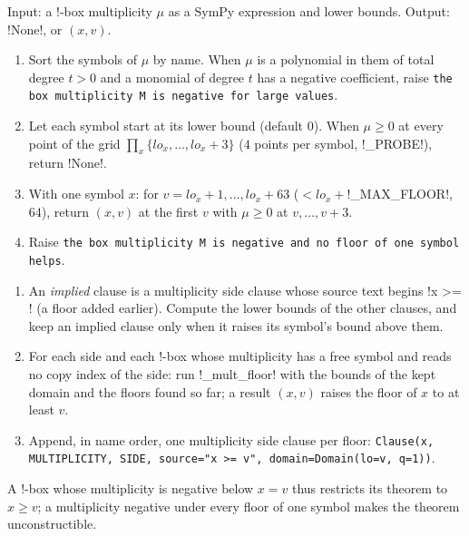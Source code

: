 \begin{algorithm}\label{alg:kernel-mult-floor}
Input: a !-box multiplicity $\mu$ as a SymPy expression and lower bounds. Output: \py!None!, or $(x, v)$.
\begin{enumerate}
\item Sort the symbols of $\mu$ by name. When $\mu$ is a polynomial in them of total degree $t>0$ and a monomial of degree $t$ has a negative coefficient, raise \texttt{the box multiplicity M is negative for large values}.
\item Let each symbol start at its lower bound (default $0$). When $\mu\ge0$ at every point of the grid $\prod_x\{\mathit{lo}_x,\ldots,\mathit{lo}_x+3\}$ ($4$ points per symbol, \py!_PROBE!), return \py!None!.
\item With one symbol $x$: for $v=\mathit{lo}_x+1,\ldots,\mathit{lo}_x+63$ ($<\mathit{lo}_x+$\py!_MAX_FLOOR!, $64$), return $(x,v)$ at the first $v$ with $\mu\ge0$ at $v,\ldots,v+3$.
\item Raise \texttt{the box multiplicity M is negative and no floor of one symbol helps}.
\end{enumerate}
\end{algorithm}

\begin{algorithm}\label{alg:kernel-box-floors}
\begin{enumerate}
\item An \emph{implied} clause is a multiplicity side clause whose source text begins \code!x >= ! (a floor added earlier). Compute the lower bounds of the other clauses, and keep an implied clause only when it raises its symbol's bound above them.
\item For each side and each !-box whose multiplicity has a free symbol and reads no copy index of the side: run \py!_mult_floor! with the bounds of the kept domain and the floors found so far; a result $(x, v)$ raises the floor of $x$ to at least $v$.
\item Append, in name order, one multiplicity side clause per floor: \texttt{Clause(\allowbreak{}x,\allowbreak{} MULTIPLICITY,\allowbreak{} SIDE,\allowbreak{} source="x >= v",\allowbreak{} domain=Domain(\allowbreak{}lo=v,\allowbreak{} q=1))}.
\end{enumerate}
\end{algorithm}

A !-box whose multiplicity is negative below $x=v$ thus restricts its theorem to $x\ge v$; a multiplicity negative under every floor of one symbol makes the theorem unconstructible.

